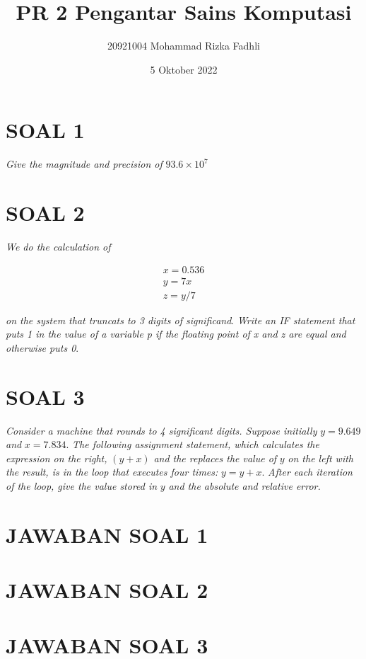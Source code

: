 \documentclass[
]{article}
\title{PR 2 Pengantar Sains Komputasi}
\subtitle{20921004 Mohammad Rizka Fadhli}
\author{}
\date{\vspace{-2.5em}5 Oktober 2022}
\begin{document}
\maketitle

\hypertarget{soal-1}{%
\section{SOAL 1}\label{soal-1}}

\emph{Give the magnitude and precision of} \(93.6 \times 10^7\)

\hypertarget{soal-2}{%
\section{SOAL 2}\label{soal-2}}

\emph{We do the calculation of}

\[\begin{matrix}
x = 0.536 \\
y = 7 x \\
z = y / 7
\end{matrix}\]

\emph{on the system that truncats to 3 digits of significand}.
\emph{Write an IF statement that puts 1 in the value of a variable p if
the floating point of x and z are equal and otherwise puts 0}.

\hypertarget{soal-3}{%
\section{SOAL 3}\label{soal-3}}

\emph{Consider a machine that rounds to 4 significant digits. Suppose
initially } \(y = 9.649\) \emph{and} \(x = 7.834\). \emph{The following
assignment statement, which calculates the expression on the right,}
\((y + x)\) \emph{and the replaces the value of} \(y\) \emph{on the left
with the result, is in the loop that executes four times:}
\(y = y + x\). \emph{After each iteration of the loop, give the value
stored in} \(y\) \emph{and the absolute and relative error.}

\newpage

\hypertarget{jawaban-soal-1}{%
\section{JAWABAN SOAL 1}\label{jawaban-soal-1}}

\newpage

\hypertarget{jawaban-soal-2}{%
\section{JAWABAN SOAL 2}\label{jawaban-soal-2}}

\newpage

\hypertarget{jawaban-soal-3}{%
\section{JAWABAN SOAL 3}\label{jawaban-soal-3}}
\end{document}
